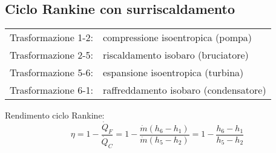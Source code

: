 \subsection{Ciclo Rankine con surriscaldamento}

\begin{tabular}{p{2.5cm}l}
Trasformazione 1-2: & compressione isoentropica (pompa)\\
Trasformazione 2-5: & riscaldamento isobaro (bruciatore)\\
Trasformazione 5-6: & espansione isoentropica (turbina)\\
Trasformazione 6-1: & raffreddamento isobaro (condensatore)\\
\end{tabular}

Rendimento ciclo Rankine:
\[ \eta = 1 - \frac{\dot{Q}_F}{\dot{Q}_C} = 1 - \frac{\dot{m}(h_6-h_1)}{\dot{m}(h_5-h_2)} = 1 - \frac{h_6-h_1}{h_5-h_2} \]

